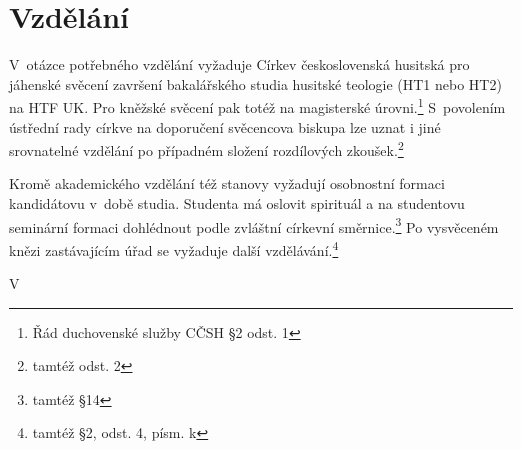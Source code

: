 \section{Vzdělání}

V~otázce potřebného vzdělání vyžaduje Církev československá husitská
pro jáhenské svěcení završení bakalářského studia husitské teologie (HT1 nebo HT2) na HTF UK. Pro
kněžské svěcení pak totéž na magisterské úrovni.\footnote{Řád duchovenské služby CČSH §2
odst. 1} S~povolením ústřední rady
církve na doporučení svěcencova biskupa lze uznat i jiné srovnatelné vzdělání po
případném složení rozdílových zkoušek.\footnote{tamtéž odst. 2}

Kromě akademického vzdělání též stanovy vyžadují osobnostní formaci kandidátovu
v~době studia. Studenta má oslovit spirituál a na studentovu seminární formaci
dohlédnout podle zvláštní církevní směrnice.\footnote{tamtéž §14}
Po vysvěceném knězi zastávajícím úřad se vyžaduje další
vzdělávání.\footnote{tamtéž §2, odst. 4, písm. k}

V 
